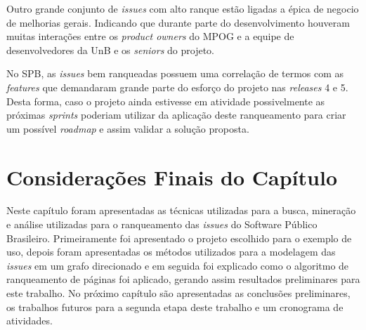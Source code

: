 \newpage
Outro grande conjunto de \textit{issues} com alto ranque estão ligadas a épica de negocio de melhorias gerais. Indicando que durante parte do desenvolvimento houveram muitas interações entre os \textit{product owners} do MPOG e a equipe de desenvolvedores da UnB e os \textit{seniors} do projeto.

No SPB, as \textit{issues} bem ranqueadas possuem uma correlação de termos com as \textit{features} que demandaram grande parte do esforço do projeto nas \textit{releases} 4 e 5. Desta forma, caso o projeto ainda estivesse em atividade possivelmente as próximas \textit{sprints} poderiam utilizar da aplicação deste ranqueamento para criar um possível \textit{roadmap} e assim validar a solução proposta.

\section{Considerações Finais do Capítulo}
Neste capítulo foram apresentadas as técnicas utilizadas para a busca, mineração e análise utilizadas para o ranqueamento das \textit{issues} do Software Público Brasileiro. Primeiramente foi apresentado o projeto escolhido para o exemplo de uso, depois foram apresentadas os métodos utilizados para a modelagem das \textit{issues} em um grafo direcionado e em seguida foi explicado como o algoritmo de ranqueamento de páginas foi aplicado, gerando assim resultados preliminares para este trabalho. No próximo capítulo são apresentadas as conclusões preliminares, os trabalhos futuros para a segunda etapa deste trabalho e um cronograma de atividades.
